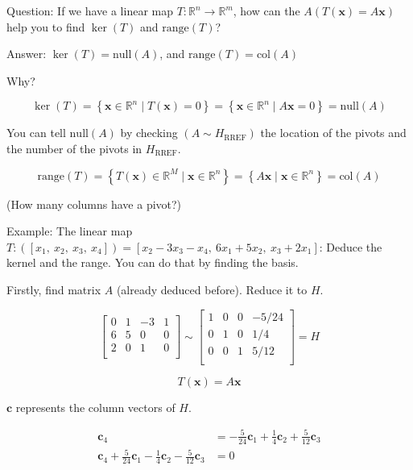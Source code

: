 \documentclass[
]{article}
\begin{document}
Question: If we have a linear map
$T:\mathbb{R}^{n} \rightarrow \mathbb{R}^{m}$, how can the
$A(T\left( \mathbf{x} \right) = A\mathbf{x})$ help you to find
$\ker(T)$ and $\text{range}{(T)}$?

Answer: $\ker(T) = \text{null}{(A)}$, and
$\text{range}{(T)} = \text{col}(A)$

Why?

$$\ker(T) = \left\{ \mathbf{x} \in \mathbb{R}^{n}\mid T\left( \mathbf{x} \right) = 0 \right\} = \left\{ \mathbf{x} \in \mathbb{R}^{n}\mid A\mathbf{x} = 0 \right\} = \text{null}(A)$$

You can tell $\text{null}(A)$ by checking
$\left( A\sim H_{\text{RREF}} \right)$ the location of the pivots and
the number of the pivots in $H_{\text{RREF}}$.

$$\text{range}{(T)} = \left\{ T\left( \mathbf{x} \right) \in \mathbb{R}^{M}\mid\mathbf{x} \in \mathbb{R}^{n} \right\} = \left\{ A\mathbf{x}\mid\mathbf{x} \in \mathbb{R}^{n} \right\} = \text{col}(A)$$

(How many columns have a pivot?)

Example: The linear map
$T:\left( \left\lbrack x_{1},\ x_{2},\ x_{3},\ x_{4} \right\rbrack \right) = \left\lbrack x_{2} - 3x_{3} - x_{4},\ 6x_{1} + 5x_{2},\ x_{3} + 2x_{1} \right\rbrack$:
Deduce the kernel and the range. You can do that by finding the basis.

Firstly, find matrix $A$ (already deduced before). Reduce it to $H$.

$$\begin{bmatrix}
0 & 1 & - 3 & 1 \\
6 & 5 & 0 & 0 \\
2 & 0 & 1 & 0 \\
\end{bmatrix}\sim\begin{bmatrix}
1 & 0 & 0 & - 5/24 \\
0 & 1 & 0 & 1/4 \\
0 & 0 & 1 & 5/12 \\
\end{bmatrix} = H$$

$$T\left( \mathbf{x} \right) = A\mathbf{x}$$

$\mathbf{c}$ represents the column vectors of $H$.

\begin{align*}
{\mathbf{c}}_{4} &= - \frac{5}{24}{\mathbf{c}}_{1} + \frac{1}{4}{\mathbf{c}}_{2} + \frac{5}{12}{\mathbf{c}}_{3}
 \\
{\mathbf{c}}_{4} + \frac{5}{24}{\mathbf{c}}_{1} - \frac{1}{4}{\mathbf{c}}_{2} - \frac{5}{12}{\mathbf{c}}_{3} &= 0
\end{align*}
\end{document}
